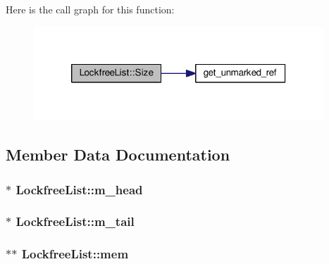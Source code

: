 Here is the call graph for this function\-:
\nopagebreak
\begin{figure}[H]
\begin{center}
\leavevmode
\includegraphics[width=308pt]{classLockfreeList_a86185dd4f9a662d83792eb5bd80f6968_cgraph}
\end{center}
\end{figure}




\subsection{Member Data Documentation}
\hypertarget{classLockfreeList_a1039f9c5ce94463555ec3c96080ad344}{
\subsubsection[{m\-\_\-head}]{$\ast$ Lockfree\-List\-::m\-\_\-head\hspace{0.3cm}{\ttfamily [private]}}}\label{classLockfreeList_a1039f9c5ce94463555ec3c96080ad344}
\hypertarget{classLockfreeList_a9965c7959a27ff3decb833f6b4c85bf4}{
\subsubsection[{m\-\_\-tail}]{$\ast$ Lockfree\-List\-::m\-\_\-tail\hspace{0.3cm}{\ttfamily [private]}}}\label{classLockfreeList_a9965c7959a27ff3decb833f6b4c85bf4}
\hypertarget{classLockfreeList_af8e0b9af4426caadf57a71a76f49dcdf}{
\subsubsection[{mem}]{$\ast$$\ast$ Lockfree\-List\-::mem\hspace{0.3cm}{\ttfamily [private]}}}\label{classLockfreeList_af8e0b9af4426caadf57a71a76f49dcdf}
